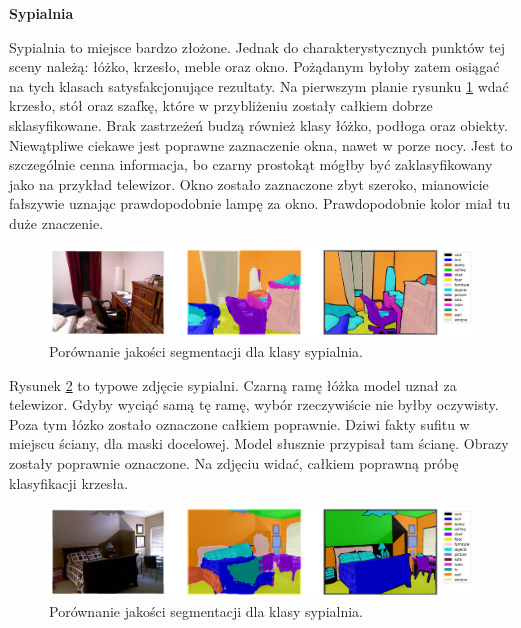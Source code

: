 \noindent
\textbf{Sypialnia}

Sypialnia to miejsce bardzo złożone. Jednak do charakterystycznych punktów tej sceny należą: łóżko, krzesło, meble oraz okno. Pożądanym byłoby zatem osiągać na tych klasach satysfakcjonujące rezultaty. Na pierwszym planie rysunku \ref{fig:bedroom-pred-1} wdać krzesło, stół oraz szafkę, które w przybliżeniu zostały całkiem dobrze sklasyfikowane. Brak zastrzeżeń budzą również klasy łóżko, podłoga oraz obiekty. Niewątpliwe ciekawe jest poprawne zaznaczenie okna, nawet w porze nocy. Jest to szczególnie cenna informacja, bo czarny prostokąt mógłby być zaklasyfikowany jako na przykład telewizor. Okno zostało zaznaczone zbyt szeroko, mianowicie fałszywie uznając prawdopodobnie lampę za okno. Prawdopodobnie kolor miał tu duże znaczenie.

\begin{figure}[ht!]
    \centering
    \includegraphics[width=\textwidth]{img/preds_analysis/gt_vs_pred/bedroom-1.png}
    \caption{Porównanie jakości segmentacji dla klasy sypialnia.}
    \label{fig:bedroom-pred-1}
\end{figure}

Rysunek \ref{fig:bedroom-pred-2} to typowe zdjęcie sypialni. Czarną ramę łóżka model uznał za telewizor. Gdyby wyciąć samą tę ramę, wybór rzeczywiście nie byłby oczywisty. Poza tym łózko zostało oznaczone całkiem poprawnie. Dziwi fakty sufitu w miejscu ściany, dla maski docelowej. Model słusznie przypisał tam ścianę. Obrazy zostały poprawnie oznaczone. Na zdjęciu widać, całkiem poprawną próbę klasyfikacji krzesła.

\begin{figure}[ht!]
    \centering
    \includegraphics[width=\textwidth]{img/preds_analysis/gt_vs_pred/bedroom-2.png}
    \caption{Porównanie jakości segmentacji dla klasy sypialnia.}
    \label{fig:bedroom-pred-2}
\end{figure}

